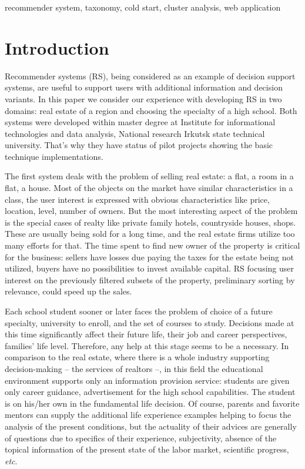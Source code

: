 \documentclass[conference]{IEEEtran}
\begin{document}
\begin{IEEEkeywords}
recommender system, taxonomy, cold start, cluster analysis, web application
\end{IEEEkeywords}

\section{Introduction}

Recommender systems (RS), being considered as an example of decision support systems, are useful to support users with additional information and decision variants.  In this paper we consider our experience with developing RS in two domains: real estate of a region and choosing the specialty of a high school.  Both systems were developed within master degree at Institute for informational technologies and data analysis, National research Irkutsk state technical university.  That's why they have status of pilot projects showing the basic technique implementations.

The first system deals with the problem of selling real estate: a flat, a room in a flat, a house.  Most of the objects on the market have similar characteristics in a class, the user interest is expressed with obvious characteristics like price, location, level, number of owners.  But the most interesting aspect of the problem is the special cases of realty like private family hotels, countryside houses, shops.  These are usually being sold for a long time, and the real estate firms utilize too many efforts for that.  The time spent to find new owner of the property is critical for the business: sellers have losses due paying the taxes for the estate being not utilized, buyers have no possibilities to invest available capital.   RS focusing user interest on the previously filtered subsets of the property, preliminary sorting by relevance, could speed up the sales.

Each school student sooner or later faces the problem of choice of a future specialty, university to enroll, and the set of courses to study.  Decisions made at this time significantly affect their future life, their job and career perspectives, families' life level.  Therefore, any help at this stage seems to be a necessary. In comparison to the real estate, where there is a whole industry supporting decision-making -- the services of realtors --, in this field the educational environment supports only an information provision service: students are given only career guidance, advertisement for the high school capabilities.  The student is on his/her own in the fundamental life decision.  Of course, parents and favorite mentors can supply the additional life experience examples helping to focus the analysis of the present conditions, but the actuality of their advices are generally of questions due to specifics of their experience, subjectivity, absence of the topical information of the present state of the labor market, scientific progress, \emph{etc}.
\end{document}
